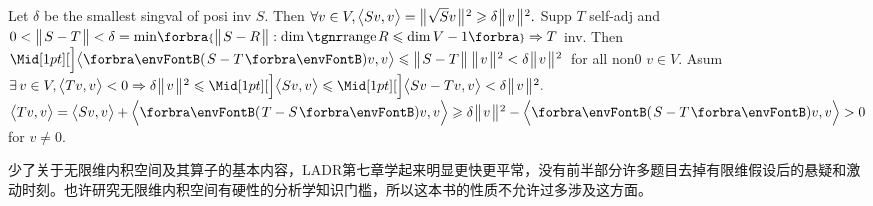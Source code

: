 Let $\delta$ be the smallest singval of posi inv $S.$ Then $\forall v\in V,\big\langle{}Sv,v{}\big\rangle=\big\Vert\hspace{1pt}{}\;\!\!\sqrt{S}v{}\hspace{1pt}\big\Vert{\hspace{0.5pt}}{^2}\geqslant\delta\:\!\big\Vert\hspace{1pt}{}v{}\hspace{1pt}\big\Vert{\hspace{0.5pt}}{^2}.$\parSol{}
Supp $T$ self-adj and $0<\Dvert{S-T}<\delta=\min\!\Bra{\Dvert{S-R}:\dim\range R\leqslant\dim V-1}\Rightarrow T$ inv.\vspace{1pt}\parSol{}
Then $\aXMid{\Ang{\Par{S-T}v,v}}\leqslant\Dvert{S-T}\:\Dvertsq{v}<\delta\:\!\Dvertsq{v}$ \,for all non0 $v\in V.$\vspace{2pt}\parSol{}
Asum $\exists\,v\in V,\Ang{Tv,v}<0\Rightarrow\delta\:\!\Dvertsq{v}\leqslant\aXMid{\Ang{Sv,v}}\leqslant\aXMid{\Ang{Sv-Tv,v}}<\delta\:\!\Dvertsq{v}.$\vspace{1pt}\parSol{}
\Or $\Ang{Tv,v}=\Ang{Sv,v}+\BigAng{\Par{T-S}v,v}\geqslant\delta\:\!\Dvertsq{v}-\BigAng{\Par{S-T}v,v}>0$ for $v\neq0.$\PfEnd
\SepLine
\ChEnd\pagebreak

{\small 少了关于无限维内积空间及其算子的基本内容，LADR第七章学起来明显更快更平常，没有前半部分许多题目去掉有限维假设后的悬疑和激动时刻。也许研究无限维内积空间有硬性的分析学知识门槛，所以这本书的性质不允许过多涉及这方面。
}\vspace{12pt}


\vspace{4pt}




